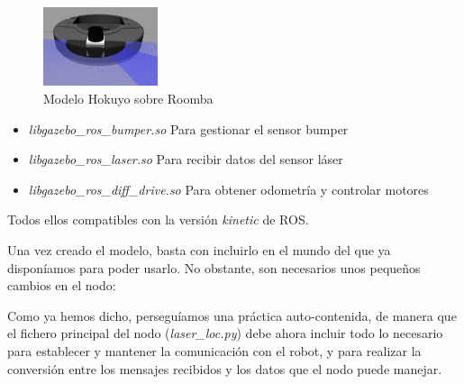 \begin{multicols}{2}
	\begin{figure}[H]
	\begin{center}
		\includegraphics[width=0.3\textwidth]{figures/hokuyo.png}
		\caption{Modelo Hokuyo sobre Roomba}
		\label{fig.hokuyo}
		\end{center}
\end{figure}

\begin{itemize}
	\item \textit{libgazebo\_ros\_bumper.so} 
Para gestionar el sensor bumper
	\item \textit{libgazebo\_ros\_laser.so}  
Para recibir datos del sensor láser
	\item \textit{libgazebo\_ros\_diff\_drive.so } 
Para obtener odometría y controlar motores
\end{itemize}
\end{multicols}

Todos ellos compatibles con la versión \textit{kinetic} de ROS.

Una vez creado el modelo, basta con incluirlo en el mundo del que ya disponíamos para poder usarlo. No obstante, son necesarios unos pequeños cambios en el nodo:

Como ya hemos dicho, perseguíamos una práctica auto-contenida, de manera que el fichero principal del nodo (\textit{laser\_loc.py}) debe ahora incluir todo lo necesario para establecer y mantener la comunicación con el robot, y para realizar la conversión entre los mensajes recibidos y los datos que el nodo puede manejar. 

